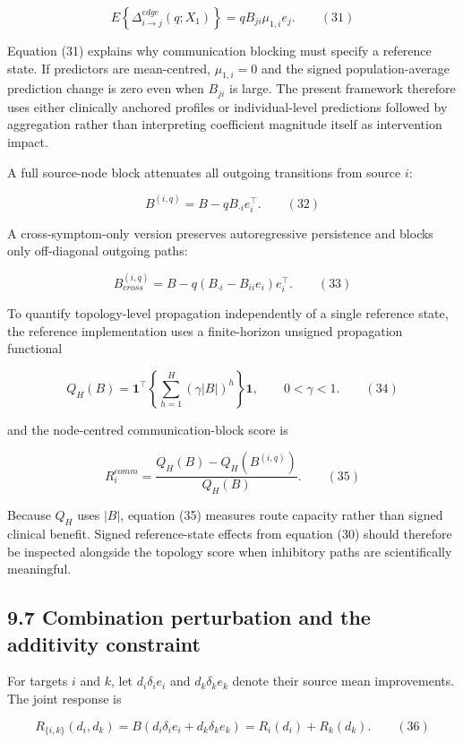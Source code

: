 \documentclass[11pt]{article}
\begin{document}
\[E\left\{ \Delta_{i \rightarrow j}^{edge}\left( q;X_{1} \right) \right\} = qB_{ji}\mu_{1,i}e_{j}.\quad\quad(31)\]

Equation (31) explains why communication blocking must specify a
reference state. If predictors are mean-centred, \(\mu_{1,i} = 0\) and
the signed population-average prediction change is zero even when
\(B_{ji}\) is large. The present framework therefore uses either
clinically anchored profiles or individual-level predictions followed by
aggregation rather than interpreting coefficient magnitude itself as
intervention impact.

A full source-node block attenuates all outgoing transitions from source
\(i\):

\[B^{(i,q)} = B - qB_{\cdot i}e_{i}^{\top}.\quad\quad(32)\]

A cross-symptom-only version preserves autoregressive persistence and
blocks only off-diagonal outgoing paths:

\[B_{cross}^{(i,q)} = B - q\left( B_{\cdot i} - B_{ii}e_{i} \right)e_{i}^{\top}.\quad\quad(33)\]

To quantify topology-level propagation independently of a single
reference state, the reference implementation uses a finite-horizon
unsigned propagation functional

\[Q_{H}(B) = \mathbf{1}^{\top}\left\{ \sum_{h = 1}^{H}\left( \gamma|B| \right)^{h} \right\}\mathbf{1},\quad\quad 0 < \gamma < 1.\quad\quad(34)\]

and the node-centred communication-block score is

\[R_{i}^{comm} = \frac{Q_{H}(B) - Q_{H}\left( B^{(i,q)} \right)}{Q_{H}(B)}.\quad\quad(35)\]

Because \(Q_{H}\) uses \(|B|\), equation (35) measures route capacity
rather than signed clinical benefit. Signed reference-state effects from
equation (30) should therefore be inspected alongside the topology score
when inhibitory paths are scientifically meaningful.

\subsection{9.7 Combination perturbation and the additivity
constraint}\label{combination-perturbation-and-the-additivity-constraint}

For targets \(i\) and \(k\), let \(d_{i}\delta_{i}e_{i}\) and
\(d_{k}\delta_{k}e_{k}\) denote their source mean improvements. The
joint response is

\[R_{\{ i,k\}}\left( d_{i},d_{k} \right) = B\left( d_{i}\delta_{i}e_{i} + d_{k}\delta_{k}e_{k} \right) = R_{i}\left( d_{i} \right) + R_{k}\left( d_{k} \right).\quad\quad(36)\]
\end{document}
